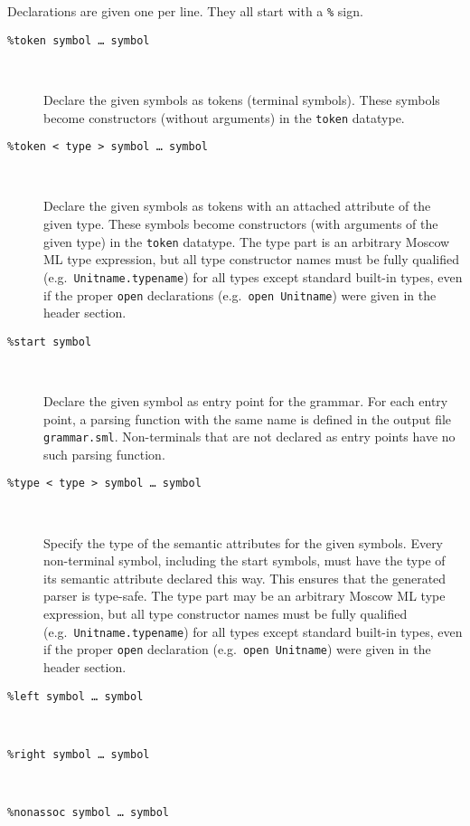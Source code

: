 \documentclass[fleqn]{article}
\begin{document}
Declarations are given one per line.  They all start with a \verb#%# sign.

\begin{description}
\item[{\tt \%token {\rm symbol \ldots\ symbol}}]\mbox{ }

  Declare the given symbols as tokens (terminal symbols).  These
  symbols become constructors (without arguments) in the {\tt token}
  datatype.

\item[{\tt \%token < {\rm type} >  {\rm symbol \ldots\ symbol}}]\mbox{
    }

  Declare the given symbols as tokens with an attached attribute of
  the given type.  These symbols become constructors (with arguments
  of the given type) in the {\tt token} datatype.  The type part is an
  arbitrary Moscow ML type expression, but all type constructor names
  must be fully qualified (e.g.\ {\tt Unitname.typename}) for all
  types except standard built-in types, even if the proper {\tt open}
  declarations (e.g.\ {\tt open Unitname}) were given in the header
  section.  

\item[{\tt \%start {\rm symbol}}]\mbox{ }

  Declare the given symbol as entry point for the grammar.  For each
  entry point, a parsing function with the same name is defined in the
  output file {\tt grammar.sml}.  Non-terminals that are not declared
  as entry points have no such parsing function.  

\item[{\tt \%type < {\rm type} >  {\rm symbol \ldots\ symbol}}]\mbox{
    }

  Specify the type of the semantic attributes for the given symbols.
  Every non-terminal symbol, including the start symbols, must have
  the type of its semantic attribute declared this way.  This ensures
  that the generated parser is type-safe.  The type part may be an
  arbitrary Moscow ML type expression, but all type constructor names
  must be fully qualified (e.g.\ {\tt Unitname.typename}) for all
  types except standard built-in types, even if the proper {\tt open}
  declaration (e.g.\ {\tt open Unitname}) were given in the header
  section.  

\item[{\tt \%left {\rm symbol \ldots\ symbol}}]\mbox{ }
\item[{\tt \%right {\rm symbol \ldots\ symbol}}]\mbox{ }
\item[{\tt \%nonassoc {\rm symbol \ldots\ symbol}}]\mbox{ }


\end{description}
\end{document}
